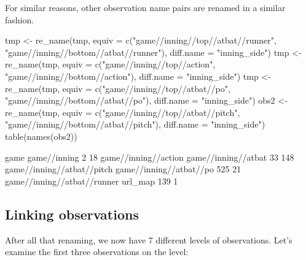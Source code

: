 \begin{article}
\begin{Schunk}
\end{Schunk}
%
For similar reasons, other observation name pairs are renamed in a
similar fashion.
%
\begin{Schunk}
\begin{Sinput}
tmp <- re_name(tmp, equiv = c("game//inning//top//atbat//runner",                             
  "game//inning//bottom//atbat//runner"), diff.name = "inning_side")
tmp <- re_name(tmp, equiv = c("game//inning//top//action",                             
  "game//inning//bottom//action"), diff.name = "inning_side")  
tmp <- re_name(tmp, equiv = c("game//inning//top//atbat//po",                            
  "game//inning//bottom//atbat//po"), diff.name = "inning_side")
obs2 <- re_name(tmp, equiv = c("game//inning//top//atbat//pitch",                             
  "game//inning//bottom//atbat//pitch"), diff.name = "inning_side") 
table(names(obs2))
\end{Sinput}
\begin{Soutput}

                       game                game//inning 
                          2                          18 
       game//inning//action         game//inning//atbat 
                         33                         148 
 game//inning//atbat//pitch     game//inning//atbat//po 
                        525                          21 
game//inning//atbat//runner                     url_map 
                        139                           1 
\end{Soutput}
\end{Schunk}
%

\subsection{Linking observations}

After all that renaming, we now have 7
different levels of observations. Let's examine the first three observations
on the  level:
%
\begin{Schunk}
\end{Schunk}
\end{article}
